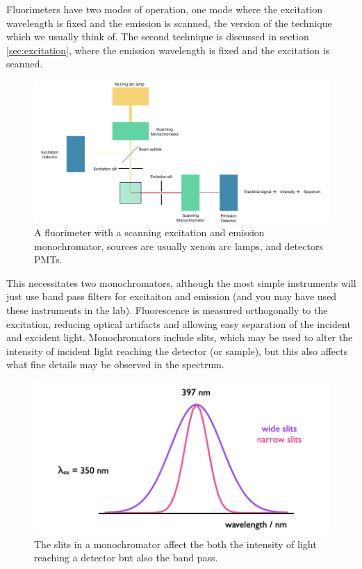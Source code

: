 \documentclass[
]{book}
\begin{document}
Fluorimeters have two modes of operation, one mode where the excitation wavelength is fixed and the emission is scanned, the version of the technique which we usually think of. The second technique is discussed in section \ref{sec:excitation}, where the emission wavelength is fixed and the excitation is scanned.

\begin{figure}

{\centering \includegraphics[width=0.8\linewidth]{images/fluorimeter} 

}

\caption{A fluorimeter with a scanning excitation and emission monochromator, sources are usually xenon arc lamps, and detectors PMTs.}\label{fig:fluorch}
\end{figure}

This necessitates two monochromators, although the most simple instruments will just use band pass filters for excitaiton and emission (and you may have used these instruments in the lab). Fluorescence is measured orthogonally to the excitation, reducing optical artifacts and allowing easy separation of the incident and excident light. Monochromators include slits, which may be used to alter the intensity of incident light reaching the detector (or sample), but this also affects what fine details may be observed in the spectrum.

\begin{figure}

{\centering \includegraphics[width=0.6\linewidth]{images/waterramanslits} 

}

\caption{The slits in a monochromator affect the both the intensity of light reaching a detector but also the band pass.}\label{fig:waterramanslits}
\end{figure}
\end{document}
